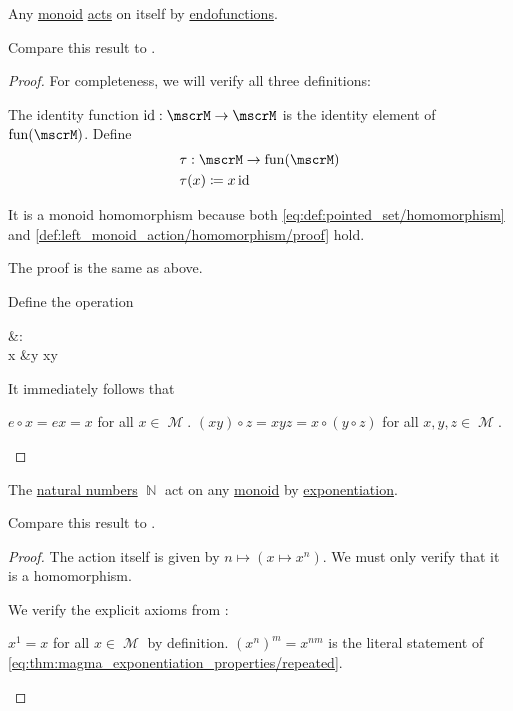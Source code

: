 \begin{proposition}\label{thm:monoid_is_action}
  Any \hyperref[def:unital_magma/associative]{monoid} \hyperref[def:left_monoid_action]{acts} on itself by \hyperref[def:endofunction]{endofunctions}.

  Compare this result to .
\end{proposition}
\begin{proof}
  For completeness, we will verify all three definitions:

   The identity function \( \id: \mscrM \to \mscrM \) is the identity element of \( \fun(\mscrM) \). Define
  \begin{align*}
    &\tau: \mscrM \to \fun(\mscrM) \\
    &\tau(x) \coloneqq x \id
  \end{align*}

  It is a monoid homomorphism because both \eqref{eq:def:pointed_set/homomorphism} and \eqref{def:left_monoid_action/homomorphism/proof} hold.

   The proof is the same as above.

   Define the operation
  \begin{balign*}
    {}&\odot{}: \mscrM \times \mscrM \to \mscrM \\
    x &\odot y \coloneqq xy
  \end{balign*}

  It immediately follows that
  \begin{refenum}
     \( e \circ x = ex = x \) for all \( x \in \mscrM \).
     \( (x y) \circ z = xyz = x \circ (y \circ z) \) for all \( x, y, z \in \mscrM \).
  \end{refenum}
\end{proof}

\begin{proposition}\label{thm:natural_numbers_monoid_action}
  The \hyperref[def:natural_numbers]{natural numbers} \( \BbbN \) act on any \hyperref[def:unital_magma/associative]{monoid} by \hyperref[def:unital_magma/exponentiation]{exponentiation}.

  Compare this result to .
\end{proposition}
\begin{proof}
  The action itself is given by \( n \mapsto (x \mapsto x^n) \). We must only verify that it is a homomorphism.

  We verify the explicit axioms from :
  \begin{refenum}
     \( x^1 = x \) for all \( x \in \mscrM \) by definition.
     \( (x^n)^m = x^{nm} \) is the literal statement of \eqref{eq:thm:magma_exponentiation_properties/repeated}.
  \end{refenum}
\end{proof}
